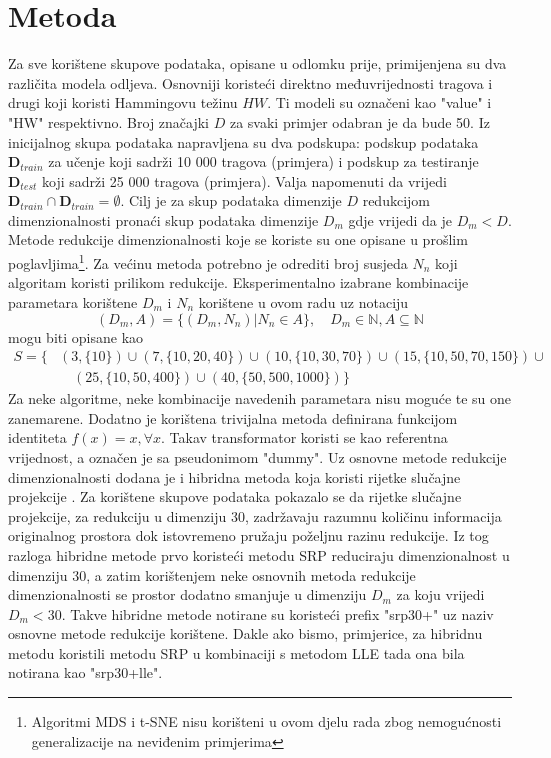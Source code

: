 \documentclass[times, utf8, diplomski]{fer}
\begin{document}
\section{Metoda}

Za sve korištene skupove podataka, opisane u odlomku prije, primijenjena su dva različita modela odljeva. Osnovniji koristeći direktno međuvrijednosti tragova i drugi koji koristi Hammingovu težinu $HW$. Ti modeli su označeni kao "value" i "HW" respektivno. Broj značajki $D$ za svaki primjer odabran je da bude 50. Iz inicijalnog skupa podataka napravljena su dva podskupa: podskup podataka $\bm{D}_{train}$ za učenje koji sadrži 10 000 tragova (primjera) i podskup za testiranje $\bm{D}_{test}$ koji sadrži 25 000 tragova (primjera). Valja napomenuti da vrijedi $\bm{D}_{train} \cap \bm{D}_{train} = \emptyset$. Cilj je za skup podataka dimenzije $D$ redukcijom dimenzionalnosti pronaći skup podataka dimenzije $D_m$ gdje vrijedi da je $D_m < D$.
Metode redukcije dimenzionalnosti koje se koriste su one opisane u prošlim poglavljima\footnote{Algoritmi MDS i t-SNE nisu korišteni u ovom djelu rada zbog nemogućnosti generalizacije na neviđenim primjerima}. Za većinu metoda potrebno je odrediti broj susjeda $N_n$ koji algoritam koristi prilikom redukcije. Eksperimentalno izabrane kombinacije parametara korištene $D_m$ i $N_n$ korištene u ovom radu uz notaciju
\[(D_m, A) = \{(D_m, N_n) | N_n \in A\}, \quad D_m \in \mathbb{N}, A \subseteq \mathbb{N} \]
mogu biti opisane kao
\begin{align*}
    S = \{
     & (3, \{10\}) \cup
    (7, \{10, 20, 40\}) \cup
    (10, \{10, 30, 70\}) \cup
    (15, \{10, 50, 70, 150\}) \cup     \\
     & \quad(25, \{10, 50, 400\}) \cup
    (40, \{50, 500, 1000\})
    \}
\end{align*} Za neke algoritme, neke kombinacije navedenih parametara nisu moguće te su one zanemarene. Dodatno je korištena trivijalna metoda definirana funkcijom identiteta $f(x) = x, \forall x$. Takav transformator koristi se kao referentna vrijednost, a označen je sa pseudonimom "dummy". Uz osnovne metode redukcije dimenzionalnosti dodana je i hibridna metoda koja koristi rijetke slučajne projekcije . Za korištene skupove podataka pokazalo se da rijetke slučajne projekcije, za redukciju u dimenziju 30, zadržavaju razumnu količinu informacija originalnog prostora dok istovremeno pružaju poželjnu razinu redukcije. Iz tog razloga hibridne metode prvo koristeći metodu SRP reduciraju dimenzionalnost u dimenziju 30, a zatim korištenjem neke osnovnih metoda redukcije dimenzionalnosti se prostor dodatno smanjuje u dimenziju $D_m$ za koju vrijedi $D_m < 30$. Takve hibridne metode notirane su koristeći prefix "srp30+" uz naziv osnovne metode redukcije korištene. Dakle ako bismo, primjerice, za hibridnu metodu koristili metodu SRP u kombinaciji s metodom LLE tada ona bila notirana kao "srp30+lle".
\end{document}
